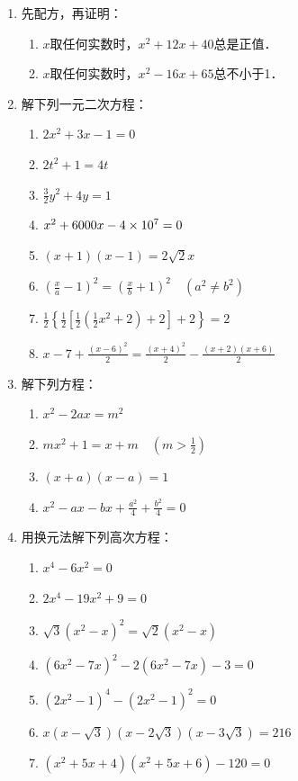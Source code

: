 \begin{enumerate}
\begin{enumerate}
\end{enumerate}

\item 先配方，再证明：
\begin{enumerate}
    \item $x$取任何实数时，$x^2+12x+40$总是正值．
    \item $x$取任何实数时，$x^2-16x+65$总不小于1．
\end{enumerate}

\item 解下列一元二次方程：
\begin{enumerate}
    \item $2x^2+3x-1=0$
    \item $2t^2+1=4t$
    \item $\frac{3}{2}y^2+4y=1$
    \item $x^2+6000x-4\times 10^7=0$
    \item $(x+1)(x-1)=2\sqrt{2}x$
    \item $\left(\frac{x}{a}-1\right)^2=\left(\frac{x}{b}+1\right)^2\quad (a^2\ne b^2)$
    \item $\frac{1}{2}\left\{\frac{1}{2}\left[\frac{1}{2}\left(\frac{1}{2}x^2+2\right)+2\right]+2\right\}=2$
    \item $x-7+\frac{(x-6)^2}{2}=\frac{(x+4)^2}{2}-\frac{(x+2)(x+6)}{2}$
\end{enumerate}

\item 解下列方程：
\begin{enumerate}
    \item $x^2-2ax=m^2$
    \item $mx^2+1=x+m\quad (m>\frac{1}{2})$
    \item $(x+a)(x-a)=1$
    \item $x^2-ax-bx+\frac{a^2}{4}+\frac{b^2}{4}=0$
\end{enumerate}

\item 用换元法解下列高次方程：
\begin{enumerate}
    \item $x^4-6x^2=0$
    \item $2x^4-19x^2+9=0$
    \item $\sqrt{3}(x^2-x)^2=\sqrt{2}(x^2-x)$
    \item $(6x^2-7x)^2-2(6x^2-7x)-3=0$
    \item $(2x^2-1)^4-(2x^2-1)^2=0$
    \item $x\left(x-\sqrt{3}\right)\left(x-2\sqrt{3}\right)\left(x-3\sqrt{3}\right)=216$
    \item $(x^2+5x+4)(x^2+5x+6)-120=0$
\end{enumerate}


\end{enumerate}
